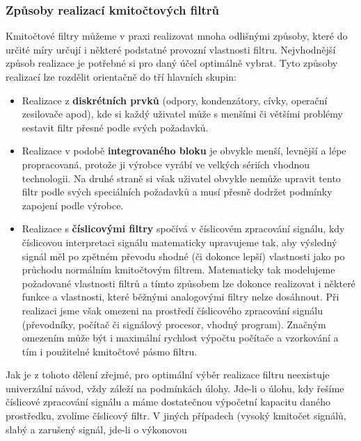       \subsubsection{Způsoby realizací kmitočtových filtrů}
        Kmitočtové filtry můžeme v praxi realizovat mnoha odlišnými způsoby, které do určité míry
        určují i některé podstatné provozní vlastnosti filtru. Nejvhodnější způsob realizace je
        potřebné si pro daný účel optimálně vybrat. Tyto způsoby realizací lze rozdělit orientačně
         do tří hlavních skupin:
        \begin{itemize}
          \item Realizace z \textbf{diskrétních prvků} (odpory, kondenzátory, cívky, operační
                zesilovače apod), kde si každý uživatel může s menšími či většími problémy sestavit
                filtr přesné podle svých požadavků.
          \item Realizace v podobě \textbf{integrovaného bloku} je obvykle menší, levnější a lépe
                propracovaná, protože ji výrobce vyrábí ve velkých sériích vhodnou technologii. Na
                druhé straně si však uživatel obvykle nemůže upravit tento filtr podle svých
                speciálních požadavků a musí přesně dodržet podmínky zapojení podle výrobce.
          \item Realizace s \textbf{číslicovými filtry} spočívá v číslicovém zpracování signálu, kdy
                číslicovou interpretaci signálu matematicky upravujeme tak, aby výsledný signál měl
                po zpětném převodu shodné (či dokonce lepší) vlastnosti jako po průchodu normálním
                kmitočtovým filtrem. Matematicky tak modelujeme požadované vlastnosti filtrů a tímto
                způsobem lze dokonce realizovat i některé funkce a vlastnosti, které běžnými
                analogovými filtry nelze dosáhnout. Při realizaci jsme však omezeni na prostředí
                číslicového zpracování signálu (převodníky, počítač či signálový procesor, vhodný
                program). Značným omezením může být i maximální rychlost výpočtu počítače a
                vzorkování a tím i použitelné kmitočtové pásmo filtru.         
        \end{itemize}
        Jak je z tohoto dělení zřejmé, pro optimální výběr realizace filtru neexistuje univerzální
        návod, vždy záleží na podmínkách úlohy. Jde-li o úlohu, kdy řešíme číslicové zpracování
        signálu a máme dostatečnou výpočetní kapacitu daného prostředku, zvolíme číslicový filtr. V
        jiných případech (vysoký kmitočet signálů, slabý a zarušený signál, jde-li o výkonovou
